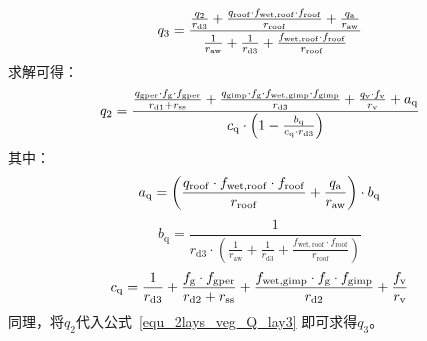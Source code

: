 %
\begin{equation}\label{equ_2lays_veg_Q_lay3}
  q_{3} = \frac{\frac{q_{2}}{r_{\mathrm{d3}}} + \frac{q_{\mathrm{roof}} \cdot f_{\mathrm{wet,roof}} \cdot f_{\mathrm{roof}}}{r_{\mathrm{roof}}} + \frac{q_{\rm a}}{r_{\mathrm{aw}}}}{\frac{1}{r_{\mathrm{aw}}} + \frac{1}{r_{\mathrm{d3}}} + \frac{f_{\mathrm{wet,roof}} \cdot f_{\mathrm{roof}}}{r_{\mathrm{roof}}}}
\end{equation}
求解可得：
\begin{equation}
  q_{2} = \\
  \frac{\frac{q_{\mathrm{gper}} \cdot f_{\mathrm{g}} \cdot f_{\mathrm{gper}}}{r_{\mathrm{d1}}+r_{\mathrm{ss}}} + \frac{q_{\mathrm{gimp}} \cdot f_{\mathrm{g}} \cdot f_{\mathrm{wet,gimp}} \cdot f_{\mathrm{gimp}}}{r_{\mathrm{d3}} } + \frac{q_{\mathrm{v}} \cdot f_{\rm v}}{r_{\mathrm{v}}} + a_{\mathrm{q}}}{c_{\mathrm{q}} \cdot \left( 1 - \frac{b_{\mathrm{q}}}{c_{\mathrm{q}} \cdot r_{\mathrm{d3}}}\right)}
\end{equation}
%
其中：
\begin{equation}
  a_{\mathrm{q}}= \left(\frac{q_{\mathrm{roof}} \cdot f_{\mathrm{wet,roof}} \cdot f_{\mathrm{roof}}}{r_{\mathrm{roof}}} + \frac{q_{\rm a}}{r_{\mathrm{aw}}}\right) \cdot b_{\mathrm{q}}
\end{equation}
%
\begin{equation}
  b_{\mathrm{q}} = \frac{1}{r_{\mathrm{d3}} \cdot \left( \frac{1}{r_{\mathrm{aw}}} + \frac{1}{r_{\mathrm{d3}}} + \frac{f_{\mathrm{wet,roof}} \cdot f_{\mathrm{roof}}}{r_{\mathrm{roof}}} \right)}
\end{equation}
%
\begin{equation}
  c_{\mathrm{q}} = \frac{1}{r_{\mathrm{d3}}}+\frac{f_{\rm g} \cdot f_{\mathrm{gper}}}{r_{\mathrm{d2}}+r_{\mathrm{ss}}} + \frac{f_{\mathrm{wet,gimp}} \cdot f_{\rm g} \cdot f_{\mathrm{gimp}}}{r_{\mathrm{d2}}} + \frac{f_{\rm v}}{r_{\mathrm{v}}}
\end{equation}
同理，将$q_{2}$代入公式~\eqref{equ_2lays_veg_Q_lay3} 即可求得$q_{3}$。

